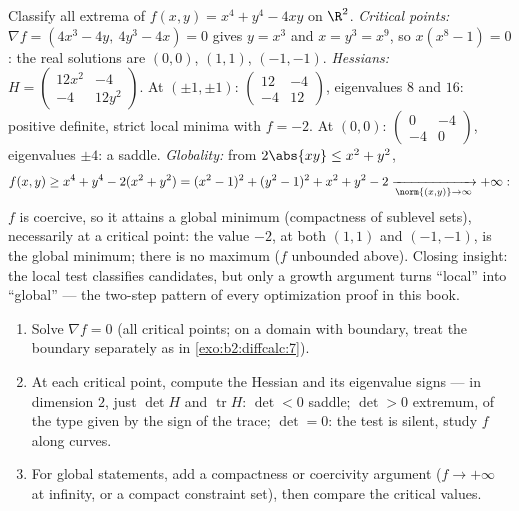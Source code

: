\begin{example}\label{ex:b2:diffcalc:quarticrun}
Classify all extrema of $f(x, y) = x^4 + y^4 - 4xy$ on $\R^2$.
\emph{Critical points:} $\nabla f = (4x^3 - 4y,\ 4y^3 - 4x) =
0$ gives $y = x^3$ and $x = y^3 = x^9$, so $x(x^8 - 1) = 0$:
the real solutions are $(0,0)$, $(1,1)$, $(-1,-1)$.
\emph{Hessians:} $H = \begin{pmatrix} 12x^2 & -4\\ -4 &
12y^2\end{pmatrix}$. At $(\pm1, \pm1)$: $\begin{pmatrix} 12 &
-4\\ -4 & 12\end{pmatrix}$, eigenvalues $8$ and $16$: positive
definite, strict local minima with $f = -2$. At $(0,0)$:
$\begin{pmatrix} 0 & -4\\ -4 & 0\end{pmatrix}$, eigenvalues
$\pm4$: a saddle. \emph{Globality:} from $2\abs{xy} \leq x^2 +
y^2$,
\[
f(x, y) \geq x^4 + y^4 - 2(x^2 + y^2)
= (x^2 - 1)^2 + (y^2 - 1)^2 + x^2 + y^2 - 2
\xrightarrow[\norm{(x,y)}\to\infty]{} +\infty :
\]
$f$ is coercive, so it attains a global minimum
(compactness of sublevel sets), necessarily at a critical
point: the value $-2$, at both $(1,1)$ and $(-1,-1)$, is the
global minimum; there is no maximum ($f$ unbounded above).
Closing insight: the local test classifies candidates, but
only a growth argument turns ``local'' into ``global'' --- the
two-step pattern of every optimization proof in this book.
\end{example}

\begin{method}\label{met:b2:diffcalc:extrema}
\begin{enumerate}
  \item Solve $\nabla f = 0$ (all critical points; on a domain
        with boundary, treat the boundary separately as in
        \cref{exo:b2:diffcalc:7}).
  \item At each critical point, compute the Hessian and its
        eigenvalue signs --- in dimension $2$, just $\det H$
        and $\operatorname{tr} H$: $\det < 0$ saddle; $\det >
        0$ extremum, of the type given by the sign of the
        trace; $\det = 0$: the test is silent, study $f$
        along curves.
  \item For global statements, add a compactness or coercivity
        argument ($f \to +\infty$ at infinity, or a compact
        constraint set), then compare the critical values.
\end{enumerate}
\end{method}

